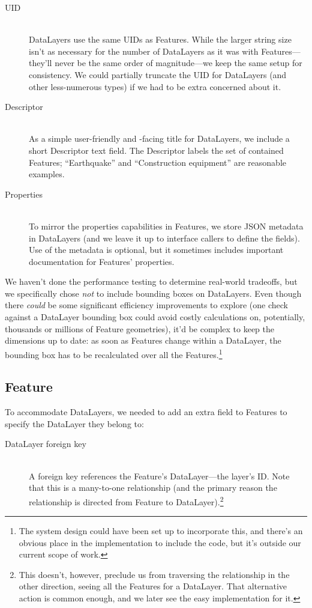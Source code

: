 \begin{description}

\item[UID] \hfill \\
DataLayers use the same UIDs as Features. While the larger string size isn't as necessary for the number of DataLayers as it was with Features---they'll never be the same order of magnitude---we keep the same setup for consistency. We could partially truncate the UID for DataLayers (and other less-numerous types) if we had to be extra concerned about it.

\item[Descriptor] \hfill \\
As a simple user-friendly and -facing title for DataLayers, we include a short Descriptor text field. The Descriptor labels the set of contained Features; ``Earthquake'' and ``Construction equipment'' are reasonable examples.

\item[Properties] \hfill \\
To mirror the properties capabilities in Features, we store JSON metadata in DataLayers (and we leave it up to interface callers to define the fields). Use of the metadata is optional, but it sometimes includes important documentation for Features' properties.
  
\end{description}

 We haven't done the performance testing to determine real-world tradeoffs, but we specifically chose \textit{not} to include bounding boxes on DataLayers. Even though there \textit{could} be some significant efficiency improvements to explore (one check against a DataLayer bounding box could avoid costly calculations on, potentially, thousands or millions of Feature geometries), it'd be complex to keep the dimensions up to date: as soon as Features change within a DataLayer, the bounding box has to be recalculated over all the Features.\footnote{The system design could have been set up to incorporate this, and there's an obvious place in the implementation to include the code, but it's outside our current scope of work.}

\subsection{Feature}
To accommodate DataLayers, we needed to add an extra field to Features to specify the DataLayer they belong to:

\begin{description}

\item[DataLayer foreign key] \hfill \\
A foreign key references the Feature's DataLayer---the layer's ID. Note that this is a many-to-one relationship (and the primary reason the relationship is directed from Feature to DataLayer).\footnote{This doesn't, however, preclude us from traversing the relationship in the other direction, seeing all the Features for a DataLayer. That alternative action is common enough, and we later see the easy implementation for it.}

\end{description}

